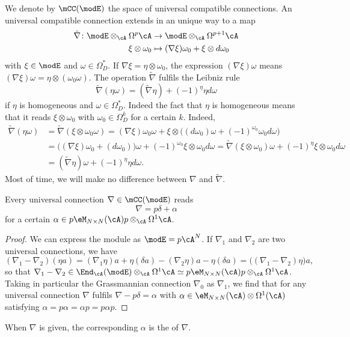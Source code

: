 We denote by $\mCC(\modE)$ the space of universal compatible connections. An universal compatible connection extends in an unique way to a map
\begin{equation}
	\begin{aligned}
		\tilde\nabla\colon \modE\otimes_{\cA}\Omega^p\cA & \to \modE\otimes_{\cA}\Omega^{p+1}\cA            \\
		\xi\otimes\omega_0                               & \mapsto (\nabla\xi)\omega_0+\xi\otimes d\omega_0
	\end{aligned}
\end{equation}
with $\xi\in\modE$ and $\omega\in\Omega^*_D$. If $\nabla\xi=\eta\otimes\omega_0$, the expression $(\nabla\xi)\omega$ means $(\nabla\xi)\omega=\eta\otimes(\omega_0\omega)$. The operation $\tilde\nabla$ fulfils the Leibniz rule
\[
	\tilde\nabla(\eta\omega)=(\tilde\nabla\eta)+(-1)^{\eta}\eta d\omega
\]
if $\eta$ is homogeneous and $\omega\in\Omega^*_D$. Indeed the fact that $\eta$ is homogeneous means that it reads $\xi\otimes\omega_0$ with $\omega_0\in\Omega_D^k$     for a certain $k$. Indeed,
\[
	\begin{split}
		\tilde\nabla(\eta\omega)&=\tilde\nabla(\xi\otimes\omega_0\omega)=(\nabla\xi)\omega_0\omega+\xi\otimes\big( (d\omega_0)\omega+(-1)^{\omega_0}\omega_0 d\omega \big)\\
		&=\big( (\nabla\xi)\omega_0+(d\omega_0) \big)\omega+(-1)^{\omega_0}\xi\otimes\omega_0 d\omega
		=\tilde\nabla(\xi\otimes\omega_0)\omega+(-1)^{\eta}\xi\otimes\omega_0 d\omega\\
		&=(\tilde\nabla\eta)\omega+(-1)^{\eta}\eta d\omega.
	\end{split}
\]
Most of time, we will make no difference between $\nabla$ and $\tilde\nabla$.

\begin{lemma}
	Every universal connection $\nabla\in\mCC(\modE)$ reads
	\begin{equation}\label{EqDefConnpdapha}
		\nabla = p\delta+\alpha
	\end{equation}
	for a certain $\alpha\in p\eM_{N\times N}(\cA)p\otimes_{\cA}\Omega^1\cA$.
\end{lemma}

\begin{proof}
	We can express the module as $\modE=p\cA^N$. If $\nabla_1$ and $\nabla_2$ are two universal connections, we have
	\[
		(\nabla_1-\nabla_2)(\eta a)=(\nabla_1\eta)a+\eta(\delta a)-(\nabla_2\eta)a-\eta(\delta a)=\big( (\nabla_1-\nabla_2)\eta \big)a,
	\]
	so that $\nabla_1-\nabla_2\in\End_{\cA}(\modE)\otimes_{\cA}\Omega^1\cA\simeq p\eM_{N\times N}(\cA)p\otimes_{\cA}\Omega^1\cA$. Taking in particular the Grassmannian connection $\nabla_0$ as $\nabla_1$, we find that for any universal connection $\nabla$ fulfils $\nabla-p\delta=\alpha$ with $\alpha\in\eM_{N\times N}(\cA)\otimes\Omega^1(\cA)$ satisfying $\alpha=p\alpha=\alpha p=p\alpha p$.
\end{proof}
When $\nabla$ is given, the corresponding $\alpha$ is the  of $\nabla$.


